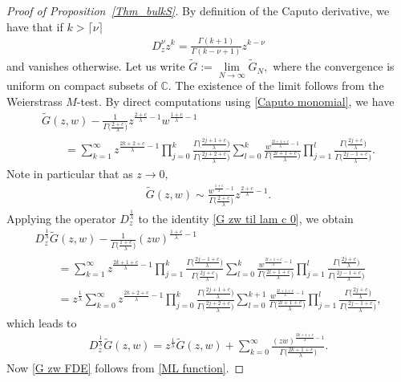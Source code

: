 \documentclass[11pt]{article}
\numberwithin{equation}{section}
\numberwithin{equation}{section}
\newcommand{\C}{{\mathbb C}}
\newcommand{\1}{\chi}
\begin{document}
\begin{proof}[Proof of Proposition~\ref{Thm_bulkS}]
	By definition of the Caputo derivative, we have that if $k>
	\lceil \nu \rceil$
	\begin{gather} \label{Caputo monomial}
		D_z^\nu z^k =\frac{\Gamma(k+1)}{\Gamma(k-\nu+1)}z^{k-\nu}
	\end{gather}
	and vanishes otherwise.
	Let us write $\widetilde{G}:=\lim\limits_{N \to \infty} \widetilde{G}_N,$ where the convergence is uniform on compact subsets of $\C$. The existence of the limit follows from the Weierstrass $M$-test.
	By direct computations using \eqref{Caputo monomial}, we have
	\begin{gather}
\widetilde{G}(z,w)-\frac{1}{\Gamma\big(\frac{2+c}{\lambda}\big)} z^{ \frac{2+c}{\lambda}-1 } w^{ \frac{1+c}{\lambda}-1 }
			\nonumber\\
\qquad{} =\sum_{k=1}^{\infty} z^{ \frac{2k+2+c}{\lambda}-1 } \prod_{j=0}^k \frac{ \Gamma\big( \frac{2j+1+c}{\lambda} \big) }{\Gamma\big( \frac{2j+2+c}{\lambda} \big)}
			\sum_{l=0}^{k} \frac{ w^{ \frac{2l+1+c}{\lambda}-1 } }{\Gamma\big( \frac{2l+1+c}{\lambda}\big)} \prod_{j=1}^l \frac{\Gamma\big( \frac{2j+c}{\lambda} \big)}{ \Gamma\big(\frac{2j-1+c}{\lambda}\big) } .\label{G zw til lam c 0}
		\end{gather}
	Note in particular that as $z\to 0,$
	\begin{gather} \label{G zw til asym}
		\widetilde{G}(z,w) \sim \frac{w^{ \frac{1+c}{\lambda}-1 } }{\Gamma\big(\frac{2+c}{\lambda}\big)} z^{ \frac{2+c}{\lambda}-1 }.
	\end{gather}
	Applying the operator $D_z^{ \frac{1}{\lambda} }$ to the identity \eqref{G zw til lam c 0}, we obtain
	\begin{gather*}
 D_z^{ \frac{1}{\lambda} } \widetilde{G}(z,w)-\frac{ 1}{\Gamma\big( \frac{1+c}{\lambda} \big)}(zw)^{ \frac{1+c}{\lambda}-1 }
		\\
\qquad{} = \sum_{k=1}^{\infty} z^{ \frac{2k+1+c}{\lambda}-1 } \prod_{j=1}^{k}\frac{ \Gamma \big( \frac{2j-1+c}{\lambda} \big) }{\Gamma\big( \frac{2j+c}{\lambda} \big)} \sum_{l=0}^{k} \frac{ w^{ \frac{2l+1+c}{\lambda}-1 } }{\Gamma\big( \frac{2l+1+c}{\lambda} \big)} \prod_{j=1}^l \frac{\Gamma\big(\frac{2j+c}{\lambda}\big) }{ \Gamma\big( \frac{2j-1+c}{\lambda} \big) }
		\\
\qquad{} = z^{ \frac{1}{\lambda} } \sum_{k=0}^{\infty} z^{ \frac{2k+2+c}{\lambda}-1 } \prod_{j=0}^k \frac{ \Gamma \big( \frac{2j+1+c}{\lambda} \big) }{\Gamma\big( \frac{2j+2+c}{\lambda} \big)} \sum_{l=0}^{k+1} \frac{ w^{ \frac{2l+1+c}{\lambda}-1 } }{\Gamma\big( \frac{2l+1+c}{\lambda} \big)} \prod_{j=1}^l \frac{\Gamma\big(\frac{2j+c}{\lambda}\big) }{ \Gamma\big( \frac{2j-1+c}{\lambda} \big) } ,
	\end{gather*}
	which leads to
	\begin{gather*}
		D_z^{ \frac{1}{\lambda} } \widetilde{G}(z,w)= z^{ \frac{1}{\lambda} } \widetilde{G}(z,w)
		+\sum_{k=0}^{\infty} \frac{ (zw)^{ \frac{2k+1+c}{\lambda}-1 } }{\Gamma\big( \frac{2k+1+c}{\lambda} \big)}.
	\end{gather*}
	Now \eqref{G zw FDE} follows from \eqref{ML function}.
	

\end{proof}
\end{document}
